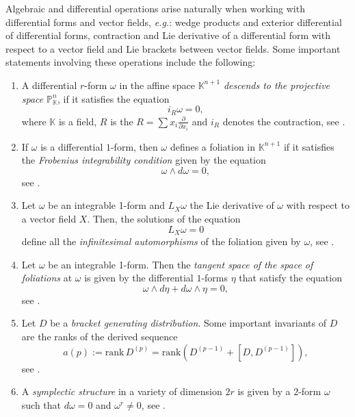 \documentclass{amsart}
\theoremstyle{definition}
\def\KK{\mathbb{K}}
\def\PP{\mathbb{P}}
\begin{document}
Algebraic and differential operations arise naturally when working with differential forms and vector fields, \emph{e.g.}:  wedge products and exterior differential of differential forms, contraction and Lie derivative of a differential form with respect to a vector field and Lie brackets between vector fields. Some important statements involving these operations include the following:
\begin{enumerate}
\item A differential $r$-form $\omega$ in the affine space $\KK^{n+1}$ \emph{descends to the projective space} $\PP^n_{\KK}$, if it satisfies the equation
\[
i_R\omega=0,
\]
where $\KK$ is a field, $R$ is the  $R=\sum x_i\frac{\partial}{\partial x_i}$ and $i_R$ denotes the contraction, see \cite[Theorem 8.13, p.~176]{hart}.
\item If $\omega$ is a differential $1$-form, then $\omega$ defines a foliation in $\KK^{n+1}$ if it satisfies the \emph{Frobenius integrability condition} given by the equation
\[
\omega\wedge d\omega=0,
\]
see \cite[Definition 2.2, p.~823]{suwa-review}.
\item Let $\omega$ be an integrable 1-form and $L_X\omega$ the Lie derivative of $\omega$ with respect to a vector field $X$. Then, the solutions of the equation 
\[
L_X\omega=0
\]
define all the \emph{infinitesimal automorphisms} of the foliation given by $\omega$,
see \cite[Proposition 7.7, p.~845]{suwa-review}.
\item Let $\omega$ be an integrable 1-form. Then the \emph{tangent space of the space of foliations} at $\omega$ is given by the differential $1$-forms $\eta$ that satisfy the equation
\[
\omega\wedge d\eta + d\omega\wedge \eta=0,
\]
see \cite[Section 2.1. p.~709]{fji}.
\item Let $D$ be a \emph{bracket generating distribution}.
Some important invariants of $D$ are the ranks of the derived sequence
\[
 a(p):=\text{rank}\, D^{(p)}=\mathrm{rank}\left( D^{(p-1)}+[D,D^{(p-1)}]\right),
 \]
 see \cite[\S 1, pp.~8-9]{Tanaka}.
\item A \emph{symplectic structure} in a variety of dimension $2r$ is given by a $2$-form $\omega$ such that $d\omega=0$ and $\omega^{r}\neq 0$, see \cite[p.~41]{bcggg}.
\end{enumerate}
\end{document}
